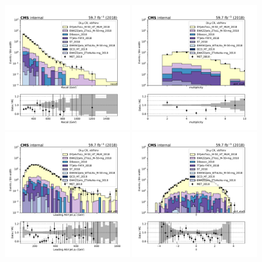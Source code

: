 {\begin{figure}[htbp]
    \begin{center}
        \includegraphics[width=0.49\textwidth]{fig/datamc/cr_2m_vbf/cr_2m_vbf_recoil_losf_2018.pdf}
        \includegraphics[width=0.49\textwidth]{fig/datamc/cr_2m_vbf/cr_2m_vbf_ak4_mult_losf_2018.pdf} \\
        \includegraphics[width=0.49\textwidth]{fig/datamc/cr_2m_vbf/cr_2m_vbf_ak4_pt0_losf_2018.pdf}
        \includegraphics[width=0.49\textwidth]{fig/datamc/cr_2m_vbf/cr_2m_vbf_ak4_eta0_losf_2018.pdf}

\end{center}
\end{figure}}
